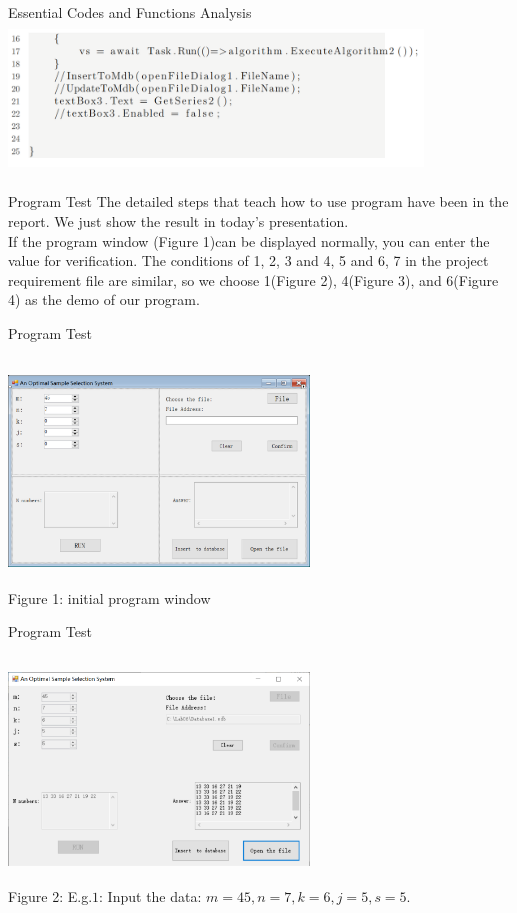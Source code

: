 \documentclass[hyperref={pdfpagelabels=false}]{beamer}
\begin{document}
\begin{frame}{Essential Codes and Functions Analysis}
    \includegraphics[width=11cm,height=4cm]{Figures/9.PNG}
\end{frame}

\begin{frame}{Program Test}
    The detailed steps that teach how to use program have been in the report. We just show the result in today's presentation.\\
    If the program window (Figure 1)can be displayed normally, you can enter the value for verification. The conditions of 1, 2, 3 and 4, 5 and 6, 7 in the project requirement file are similar, so we choose 1(Figure 2), 4(Figure 3), and 6(Figure 4) as the demo of our program.
\end{frame}

\begin{frame}{Program Test}
\begin{center}
    \includegraphics[width=8cm,height=6cm]{Figures/initial.png}\\
    Figure 1: initial program window
\end{center}
\end{frame}

\begin{frame}{Program Test}
\begin{center}
    \includegraphics[width=8cm,height=6cm]{Figures/f1.png}\\
    Figure 2: E.g.$1$: Input the data: $m=45, n=7, k=6, j=5, s=5.$
\end{center}  
\end{frame}
\end{document}
